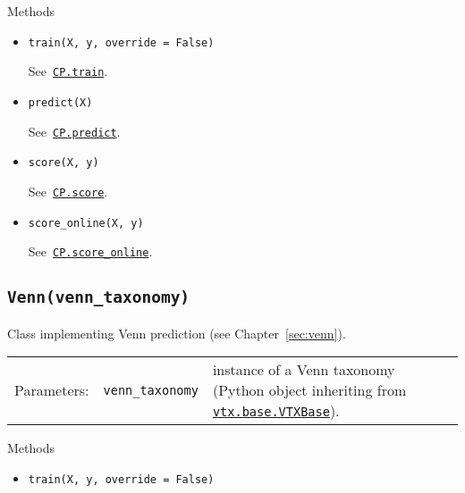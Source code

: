 \documentclass[twoside,11pt]{article}
\begin{document}
\begin{appendices}
      Methods

      \begin{itemize}

        \item
          \texttt{train(X, y, override = False)}

          See~\hyperref[itm:cp_train]
          {\texttt{CP.train}}.
          \\

        \item
          \texttt{predict(X)}

          See~\hyperref[itm:cp_predict]
          {\texttt{CP.predict}}.
          \\

        \item
          \texttt{score(X, y)}

          See~\hyperref[itm:cp_score]
          {\texttt{CP.score}}.
          \\

        \item
          \texttt{score\_online(X, y)}

          See~\hyperref[itm:cp_score_online]
          {\texttt{CP.score\_online}}.

      \end{itemize}

    \subsection*{\texttt{Venn(venn\_taxonomy)}}

      Class implementing Venn prediction
      (see Chapter~\ref{sec:venn}).
      \\

      \begin{tabu}{llX}
        Parameters: &\texttt{venn\_taxonomy}
                    &instance of a Venn taxonomy (Python
                     object inheriting from
                     \hyperref[itm:vtxbase]
                     {\texttt{vtx.base.VTXBase}}).
      \end{tabu}

      Methods

      \begin{itemize}

        \item
          \texttt{train(X, y, override = False)}


\end{itemize}
\end{appendices}
\end{document}
